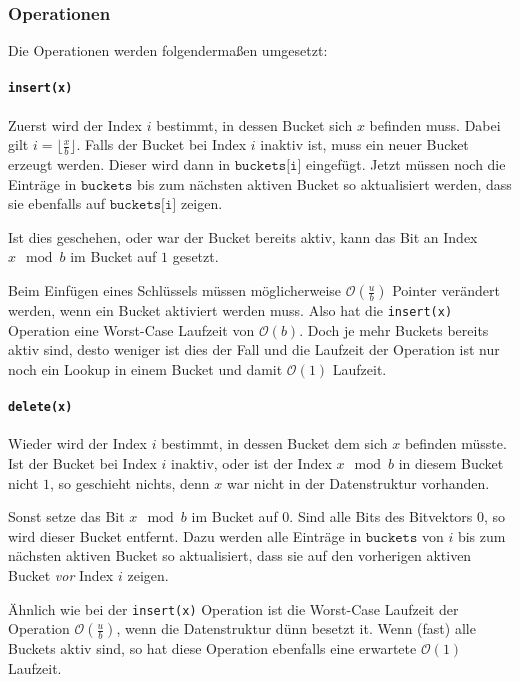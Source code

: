 \subsubsection{Operationen}

Die Operationen werden folgendermaßen umgesetzt:

\paragraph{\texttt{insert(x)}}

Zuerst wird der Index $i$ bestimmt, in dessen Bucket sich $x$ befinden muss. Dabei gilt $i = \lfloor \tfrac{x}{b} \rfloor$. Falls der Bucket bei Index $i$ inaktiv ist, muss ein neuer Bucket erzeugt werden. Dieser wird dann in $\texttt{buckets[i]}$ eingefügt.
Jetzt müssen noch die Einträge in $\texttt{buckets}$ bis zum nächsten aktiven Bucket so aktualisiert werden, dass sie ebenfalls auf $\texttt{buckets[i]}$ zeigen.

Ist dies geschehen, oder war der Bucket bereits aktiv, kann das Bit an Index $x \mod b$ im Bucket auf $1$ gesetzt.

Beim Einfügen eines Schlüssels müssen möglicherweise $\mathcal{O}(\tfrac{u}{b})$ Pointer verändert werden, wenn ein Bucket aktiviert werden muss. Also hat die \texttt{insert(x)} Operation eine Worst-Case Laufzeit von $\mathcal{O}(b)$. Doch je mehr Buckets bereits aktiv sind, desto weniger ist dies der Fall und die Laufzeit der Operation ist nur noch ein Lookup in einem Bucket und damit $\mathcal{O}(1)$ Laufzeit.

\paragraph{\texttt{delete(x)}}

Wieder wird der Index $i$ bestimmt, in dessen Bucket dem sich $x$ befinden müsste. Ist der Bucket bei Index $i$ inaktiv, oder ist der Index $x \mod b$ in diesem Bucket nicht $1$, so geschieht nichts, denn $x$ war nicht in der Datenstruktur vorhanden.

Sonst setze das Bit $x \mod b$ im Bucket auf $0$. Sind alle Bits des Bitvektors $0$, so wird dieser Bucket entfernt. Dazu werden alle Einträge in $\texttt{buckets}$ von $i$ bis zum nächsten aktiven Bucket so aktualisiert, dass sie auf den vorherigen aktiven Bucket \textit{vor} Index $i$ zeigen.

Ähnlich wie bei der \texttt{insert(x)} Operation ist die Worst-Case Laufzeit der Operation $\mathcal{O}(\tfrac{u}{b})$, wenn die Datenstruktur dünn besetzt it. Wenn (fast) alle Buckets aktiv sind, so hat diese Operation ebenfalls eine erwartete $\mathcal{O}(1)$ Laufzeit.


